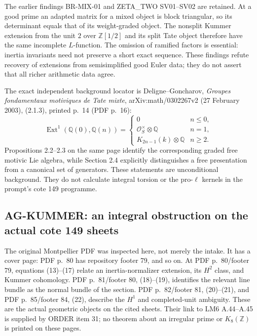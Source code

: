 The earlier findings BR-MIX-01 and ZETA\_TWO SV01--SV02 are retained.
At a good prime an adapted matrix for a mixed object is block triangular,
so its determinant equals that of its weight-graded object. The nonsplit
Kummer extension from the unit $2$ over $\mathbb Z[1/2]$ and its split
Tate object therefore have the same incomplete $L$-function. The omission
of ramified factors is essential: inertia invariants need not preserve a
short exact sequence. These findings refute recovery of extensions from
semisimplified good Euler data; they do not assert that all richer
arithmetic data agree.

The exact independent background locator is Deligne--Goncharov,
\emph{Groupes fondamentaux motiviques de Tate mixte},
arXiv:math/0302267v2 (27 February 2003), (2.1.3), printed p.~14
(PDF p.~16):
\[
 \operatorname{Ext}^1(\mathbb Q(0),\mathbb Q(n))=
 \begin{cases}
 0&n\le0,\\
 \mathcal O_S^\times\otimes\mathbb Q&n=1,\\
 K_{2n-1}(k)\otimes\mathbb Q&n\ge2.
 \end{cases}
\]
Propositions 2.2--2.3 on the same page identify the corresponding graded
free motivic Lie algebra, while Section 2.4 explicitly distinguishes a
free presentation from a canonical set of generators. These statements
are unconditional background. They do not calculate integral torsion or
the pro-$\ell$ kernels in the prompt's cote 149 programme.

\subsection{AG-KUMMER: an integral obstruction on the actual cote 149 sheets}
\label{ag:kummer}

The original Montpellier PDF was inspected here, not merely the intake.
It has a cover page: PDF p.~80 has repository footer 79, and so on.
At PDF p.~80/footer 79, equations (13)--(17) relate an inertia-normalizer
extension, its $H^2$ class, and Kummer cohomology. PDF p.~81/footer 80,
(18)--(19), identifies the relevant line bundle as the normal bundle of
the section. PDF p.~82/footer 81, (20)--(21), and PDF p.~85/footer 84,
(22), describe the $H^1$ and completed-unit ambiguity. These are the
actual geometric objects on the cited sheets. Their link to LM6
A.44--A.45 is supplied by ORDER item 31; no theorem about an irregular
prime or $K_8(\mathbb Z)$ is printed on these pages.


